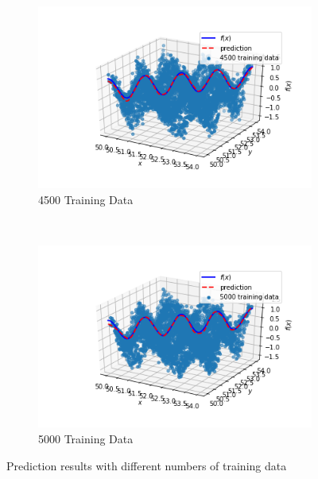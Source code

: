 \documentclass{article}
\begin{document}
\begin{figure}[htbp]
\begin{subfigure}{0.45\textwidth}
        \includegraphics[width=\textwidth]{figures/4500TrainingData}
        \caption{4500 Training Data}
    \end{subfigure}
        ~ %
    \begin{subfigure}{0.45\textwidth}
        \includegraphics[width=\textwidth]{figures/5000TrainingData}
        \caption{5000 Training Data}
    \end{subfigure}
    \caption{Prediction results with different numbers of training data}

\end{figure}

\end{document}

